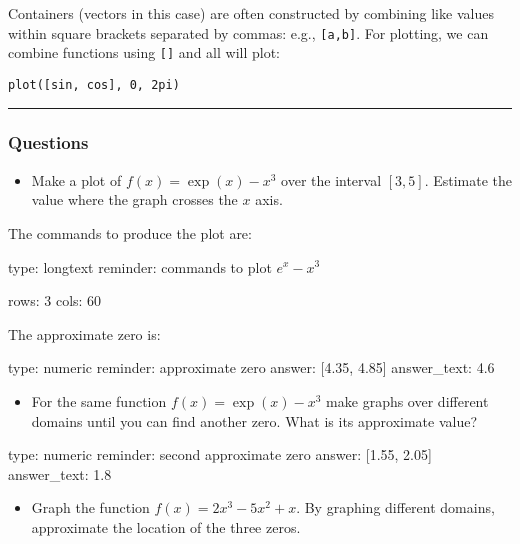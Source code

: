 \documentclass[12pt]{article}
\begin{document}
Containers (vectors in this case) are often constructed by combining
like values within square brackets separated by commas: e.g.,
\texttt{{[}a,b{]}}. For plotting, we can combine functions using
\texttt{{[}{]}} and all will plot:



\begin{verbatim}
plot([sin, cos], 0, 2pi)
\end{verbatim}
\begin{center}\rule{3in}{0.4pt}\end{center}

\subsubsection{Questions}

\begin{itemize}
\itemsep1pt\parskip0pt
\item
  Make a plot of $f(x) = \exp(x) - x^3$ over the interval $[3,5]$.
  Estimate the value where the graph crosses the $x$ axis.
\end{itemize}

The commands to produce the plot are:

\begin{answer}
type: longtext
reminder: commands to plot \( e^x - x^3 \)

rows: 3
cols: 60
\end{answer}

The approximate zero is:

\begin{answer}
    type: numeric
    reminder: approximate zero
    answer: [4.35, 4.85]
answer_text: 4.6 
\end{answer}

\begin{itemize}
\itemsep1pt\parskip0pt
\item
  For the same function $f(x) = \exp(x) - x^3$ make graphs over
  different domains until you can find another zero. What is its
  approximate value?
\end{itemize}

\begin{answer}
    type: numeric
    reminder: second approximate zero
    answer: [1.55, 2.05]
answer_text: 1.8 
\end{answer}

\begin{itemize}
\itemsep1pt\parskip0pt
\item
  Graph the function $f(x) = 2x^3 - 5x^2 + x$. By graphing different
  domains, approximate the location of the three zeros.
\end{itemize}
\end{document}
